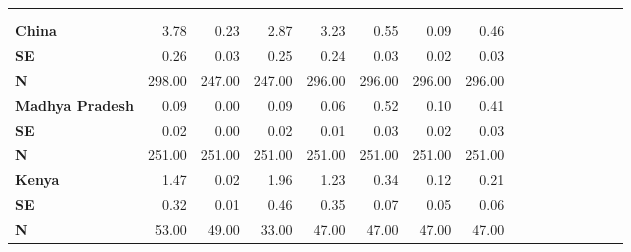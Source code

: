\begin{tabular}{@{\extracolsep{5pt}}lrrrrrrrrrrrrrrr}
\toprule
&  &  &  &  &  &  &  \\
{\bf } &  &  &  &  &  &  &  \\
\hline
{\bf China} & 3.78\phantom{***} & 0.23\phantom{***} & 2.87\phantom{***} & 3.23\phantom{***} & 0.55\phantom{***} & 0.09\phantom{***} & 0.46\phantom{***} \\
{\bf SE} & 0.26\phantom{***} & 0.03\phantom{***} & 0.25\phantom{***} & 0.24\phantom{***} & 0.03\phantom{***} & 0.02\phantom{***} & 0.03\phantom{***} \\
{\bf N} & 298.00\phantom{***} & 247.00\phantom{***} & 247.00\phantom{***} & 296.00\phantom{***} & 296.00\phantom{***} & 296.00\phantom{***} & 296.00\phantom{***} \\
{\bf Madhya Pradesh} & 0.09\phantom{***} & 0.00\phantom{***} & 0.09\phantom{***} & 0.06\phantom{***} & 0.52\phantom{***} & 0.10\phantom{***} & 0.41\phantom{***} \\
{\bf SE} & 0.02\phantom{***} & 0.00\phantom{***} & 0.02\phantom{***} & 0.01\phantom{***} & 0.03\phantom{***} & 0.02\phantom{***} & 0.03\phantom{***} \\
{\bf N} & 251.00\phantom{***} & 251.00\phantom{***} & 251.00\phantom{***} & 251.00\phantom{***} & 251.00\phantom{***} & 251.00\phantom{***} & 251.00\phantom{***} \\
{\bf Kenya} & 1.47\phantom{***} & 0.02\phantom{***} & 1.96\phantom{***} & 1.23\phantom{***} & 0.34\phantom{***} & 0.12\phantom{***} & 0.21\phantom{***} \\
{\bf SE} & 0.32\phantom{***} & 0.01\phantom{***} & 0.46\phantom{***} & 0.35\phantom{***} & 0.07\phantom{***} & 0.05\phantom{***} & 0.06\phantom{***} \\
{\bf N} & 53.00\phantom{***} & 49.00\phantom{***} & 33.00\phantom{***} & 47.00\phantom{***} & 47.00\phantom{***} & 47.00\phantom{***} & 47.00\phantom{***} \\
\hline
\end{tabular}

